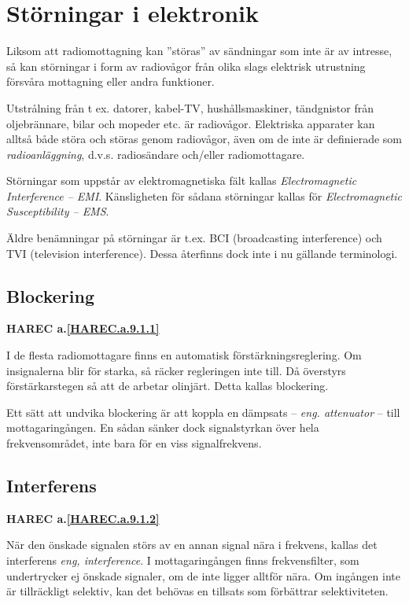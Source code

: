 \section{Störningar i elektronik}

Liksom att radiomottagning kan ''störas'' av sändningar som inte är av
intresse, så kan störningar i form av radiovågor från olika slags
elektrisk utrustning försvåra mottagning eller andra funktioner.

Utstrålning från t ex. datorer, kabel-TV, hushållsmaskiner,
tändgnistor från oljebrännare, bilar och mopeder etc. är radiovågor.
Elektriska apparater kan alltså både störa och störas genom
radiovågor, även om de inte är definierade som \emph{radioanläggning},
d.v.s. radiosändare och/eller radiomottagare.

Störningar som uppstår av elektromagnetiska fält kallas
\emph{Electromagnetic Interference -- EMI}. Känsligheten för sådana
störningar kallas för \emph{Electromagnetic Susceptibility -- EMS}.

Äldre benämningar på störningar är t.ex. BCI (broadcasting interference) och
TVI (television interference). Dessa återfinns dock inte i nu gällande
terminologi.

\subsection{Blockering}
\textbf{
HAREC a.\ref{HAREC.a.9.1.1}\label{myHAREC.a.9.1.1}
}

I de flesta radiomottagare finns en automatisk förstärkningsreglering. Om
insignalerna blir för starka, så räcker regleringen inte till. Då överstyrs 
förstärkarstegen så att de arbetar olinjärt. Detta kallas blockering.

Ett sätt att undvika blockering är att koppla en dämpsats -- \emph{eng.
attenuator} -- till mottagaringången. En sådan sänker dock signalstyrkan
över hela frekvensområdet, inte bara för en viss signalfrekvens.

\subsection{Interferens}
\textbf{
HAREC a.\ref{HAREC.a.9.1.2}\label{myHAREC.a.9.1.2}
}

När den önskade signalen störs av en annan signal nära i frekvens, kallas det
interferens \emph{eng, interference}. I mottagaringången finns frekvensfilter,
som undertrycker ej önskade signaler, om de inte ligger alltför nära. Om
ingången inte är tillräckligt selektiv, kan det behövas en tillsats som
förbättrar selektiviteten.

